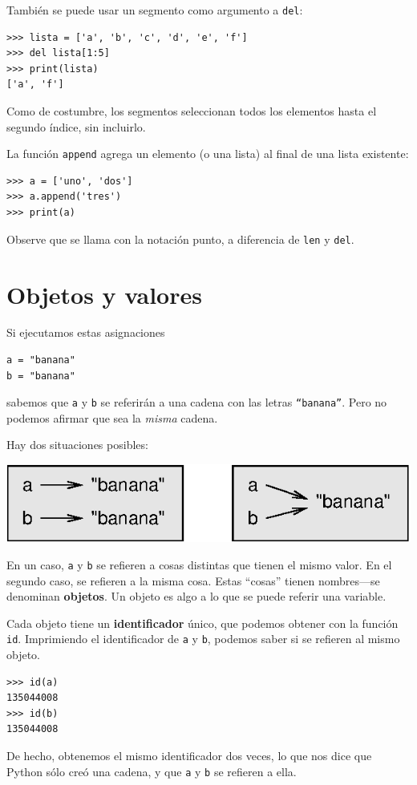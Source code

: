 También se puede usar un segmento como argumento a \texttt{del}:
\begin{lstlisting}
>>> lista = ['a', 'b', 'c', 'd', 'e', 'f']
>>> del lista[1:5]
>>> print(lista)
['a', 'f']
\end{lstlisting}
Como de costumbre, los segmentos seleccionan todos los elementos hasta
el segundo índice, sin incluirlo.

La función \texttt{append} agrega un elemento (o una lista) al final
de una lista existente:
\begin{lstlisting}
>>> a = ['uno', 'dos']
>>> a.append('tres')
>>> print(a)
\end{lstlisting}
Observe que se llama con la notación punto, a diferencia de \texttt{len}
y \texttt{del}.

\section{Objetos y valores}

 

Si ejecutamos estas asignaciones
\begin{lstlisting}
a = "banana"
b = "banana"
\end{lstlisting}
sabemos que \texttt{a} y \texttt{b} se referirán a una cadena con
las letras \texttt{``banana''}. Pero no podemos afirmar que sea
la {\em misma} cadena.

Hay dos situaciones posibles:

\beforefig \centerline{\includegraphics{illustrations/list1}}
\afterfig

En un caso, \texttt{a} y \texttt{b} se refieren a cosas distintas
que tienen el mismo valor. En el segundo caso, se refieren a la misma
cosa. Estas ``cosas'' tienen nombres—se denominan \textbf{objetos}.
Un objeto es algo a lo que se puede referir una variable.

Cada objeto tiene un \textbf{identificador} único, que podemos obtener
con la función \texttt{id}. Imprimiendo el identificador de \texttt{a}
y \texttt{b}, podemos saber si se refieren al mismo objeto.
\begin{lstlisting}
>>> id(a)
135044008
>>> id(b)
135044008
\end{lstlisting}
De hecho, obtenemos el mismo identificador dos veces, lo que nos dice
que Python sólo creó una cadena, y que \texttt{a} y \texttt{b} se
refieren a ella.

